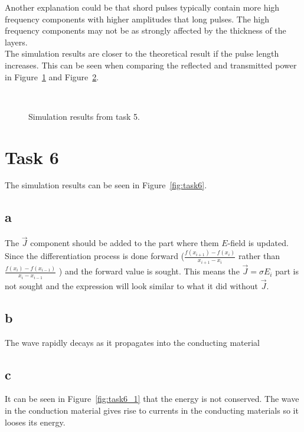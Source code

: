 \documentclass[12pt,a4paper]{article}
\begin{document}
Another explanation could be that shord pulses typically contain more high frequency components with higher amplitudes that long pulses. The high frequency components may not be as strongly affected by the thickness of the layers.
\\
\noindent The simulation results are closer to the theoretical result if the pulse length increases. This can be seen when comparing the reflected and transmitted power in Figure~\ref{fig:task5_1} and Figure~\ref{fig:task5_2}.
\begin{figure}
  \centering
    \begin{subfigure}[b]{0.7\textwidth}
        \noindent\makebox[\textwidth]{\scalebox{0.7}{}}
        \label{fig:task5_1}
    \end{subfigure}\\
    \begin{subfigure}[b]{0.49\textwidth}
        \noindent\makebox[\textwidth]{\scalebox{0.7}{}}
        \label{fig:task5_2}
    \end{subfigure}
  \caption{Simulation results from task 5.}
  \label{fig:task5}
\end{figure}

\section{Task 6}\label{sec:6}
The simulation results can be seen in Figure~\ref{fig:task6}.
\subsection{a}
The $\vec{J}$ component should be added to the part where them $E$-field is updated. Since the differentiation process is done forward \Big($\frac{f(x_{i+1})-f(x_{i})}{x_{i+1}-x_{i}}$ rather than $\frac{f(x_{i})-f(x_{i-1})}{x_{i}-x_{i-1}}$ \Big) and the forward value is sought. This means the $\vec{J}=\sigma E_{i}$ part is not sought and the expression will look similar to what it did without $\vec{J}$.
\subsection{b}
The wave rapidly decays as it propagates into the conducting material
\subsection{c}
It can be seen in Figure~\ref{fig:task6_1} that the energy is not conserved. The wave in the conduction material gives rise to currents in the conducting materials so it looses its energy.
\end{document}
